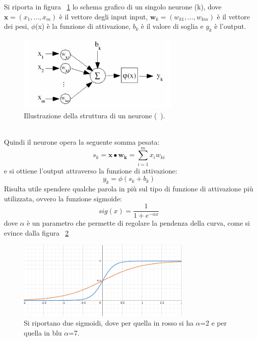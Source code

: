 Si riporta in figura ~\ref{schema_neurone} lo schema grafico di un singolo neurone (k), dove $\textbf{x} = (x_1 ,..., x_m)$ è il vettore degli input input, $\textbf{w}_k = (w_{k1} ,..., w_{km})$ è il vettore dei pesi, $\phi$(x) è la funzione di attivazione, $b_k$ è il valore di soglia e $y_k$ è l'output.
\begin{figure}[h!]
	\centering
	\includegraphics[width=0.70\textwidth]{figs/schema_neurone.png}
	\caption{Illustrazione della struttura di un neurone (~\cite{Intro_retiN}).}
	\label{schema_neurone}	
\end{figure} \\
Quindi il neurone opera la seguente somma pesata:
\begin{equation}
	s_k = \textbf{x}\bullet\textbf{w}_\textbf{k} = \sum_{i=1}^{m}x_iw_{ki}
\end{equation}
e si ottiene l'output attraverso la funzione di attivazione: 
\begin{equation}
y_k = \phi(s_k + b_k)
\end{equation}
Risulta utile spendere qualche parola in più sul tipo di funzione di attivazione più utilizzata, ovvero la funzione sigmoide:
\begin{equation}
	sig(x) = \frac{1}{1 + e^{-{\alpha}x}}
\end{equation} 
dove $\alpha$ è un parametro che permette di regolare la pendenza della curva, come si evince dalla figura ~\ref{sigmoide}
\begin{figure}[h!]
	\centering
	\includegraphics[width=0.75\textwidth]{figs/sigmoide.png}
	\caption{Si riportano due sigmoidi, dove per quella in rosso si ha $\alpha$=2 e per quella in blu $\alpha$=7.}
	\label{sigmoide}
\end{figure}
